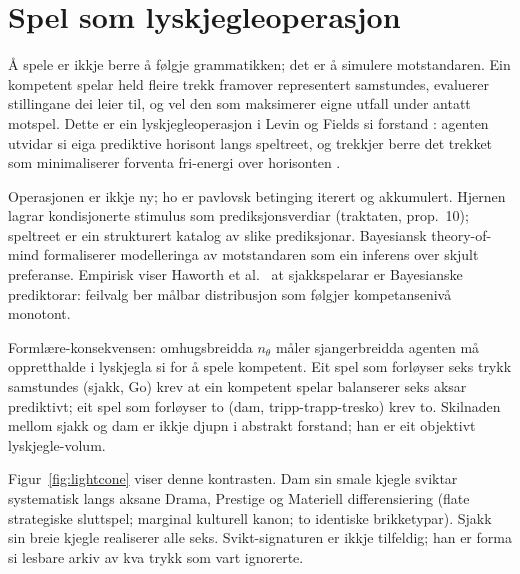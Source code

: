 \documentclass[10pt,twocolumn]{article}
\begin{document}
\section{Spel som lyskjegleoperasjon}

\AA{} spele er ikkje berre \aa{} f\o lgje grammatikken; det er \aa{} simulere motstandaren. Ein kompetent spelar held fleire trekk framover representert samstundes, evaluerer stillingane dei leier til, og vel den som maksimerer eigne utfall under antatt motspel. Dette er ein lyskjegleoperasjon i Levin og Fields si forstand \citep{fields2022}: agenten utvidar si eiga prediktive horisont langs speltreet, og trekkjer berre det trekket som minimaliserer forventa fri-energi over horisonten \citep{friston2010,pezzulo2015}.

Operasjonen er ikkje ny; ho er pavlovsk betinging iterert og akkumulert. Hjernen lagrar kondisjonerte stimulus som prediksjonsverdiar (traktaten, prop.\ 10); speltreet er ein strukturert katalog av slike prediksjonar. Bayesiansk theory-of-mind \citep{baker2011} formaliserer modelleringa av motstandaren som ein inferens over skjult preferanse. Empirisk viser Haworth et al.\ \citep{haworth2010} at sjakkspelarar er Bayesianske prediktorar: feilvalg ber m\aa lbar distribusjon som f\o lgjer kompetanseniv\aa{} monotont.

Forml\ae re-konsekvensen: omhugsbreidda $n_\theta$ m\aa ler sjangerbreidda agenten m\aa{} oppretthalde i lyskjegla si for \aa{} spele kompetent. Eit spel som forl\o yser seks trykk samstundes (sjakk, Go) krev at ein kompetent spelar balanserer seks aksar prediktivt; eit spel som forl\o yser to (dam, tripp-trapp-tresko) krev to. Skilnaden mellom sjakk og dam er ikkje \guillemotleft djupn\guillemotright{} i abstrakt forstand; han er eit objektivt lyskjegle-volum.

Figur~\ref{fig:lightcone} viser denne kontrasten. Dam sin smale kjegle sviktar systematisk langs aksane Drama, Prestige og Materiell differensiering (flate strategiske sluttspel; marginal kulturell kanon; to identiske brikketypar). Sjakk sin breie kjegle realiserer alle seks. Svikt-signaturen er ikkje tilfeldig; han er forma si lesbare arkiv av kva trykk som vart ignorerte.
\end{document}

